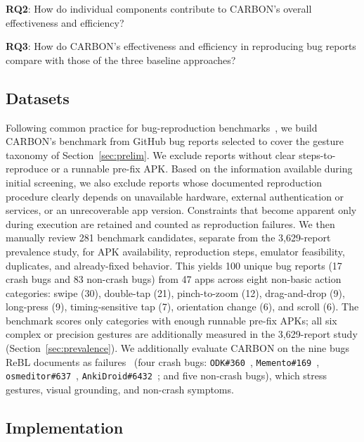 \documentclass[10pt,conference,a4paper]{IEEEtran}
\begin{document}
\textbf{RQ2}: How do individual components contribute to CARBON's overall
effectiveness and efficiency?

\textbf{RQ3}: How do CARBON's effectiveness and efficiency in reproducing
bug reports compare with those of the three baseline approaches?


  \subsection{Datasets}
  \label{sec:datasets}

  Following common practice for bug-reproduction benchmarks~\cite{rebl,adbgpt,andror2}, we build CARBON's benchmark from GitHub bug reports selected to cover the gesture taxonomy of Section~\ref{sec:prelim}. We exclude reports without clear steps-to-reproduce or a runnable pre-fix APK. Based on the information available during initial screening, we also exclude reports whose documented reproduction procedure clearly depends on unavailable hardware, external authentication or services, or an unrecoverable app version. Constraints that become apparent only during execution are retained and counted as reproduction failures. We then manually review 281 benchmark candidates, separate from the 3{,}629-report prevalence study, for APK availability, reproduction steps, emulator feasibility, duplicates, and already-fixed behavior. This yields 100 unique bug reports (17 crash bugs and 83 non-crash bugs) from 47 apps across eight non-basic action categories: swipe (30), double-tap (21), pinch-to-zoom (12), drag-and-drop (9), long-press (9), timing-sensitive tap (7), orientation change (6), and scroll (6). The benchmark scores only categories with enough runnable pre-fix APKs; all six complex or precision gestures are additionally measured in the 3{,}629-report study (Section~\ref{sec:prevalence}). We additionally evaluate CARBON on the nine bugs ReBL documents as failures~\cite{rebl} (four crash bugs: \texttt{ODK\#360}~\cite{odk360}, \texttt{Memento\#169}~\cite{memento169}, \texttt{osmeditor\#637}~\cite{osmeditor637}, \texttt{AnkiDroid\#6432}~\cite{anki6432}; and five non-crash bugs), which stress gestures, visual grounding, and non-crash symptoms.
   

  \subsection{Implementation}
  \label{sec:implementation}
\end{document}
